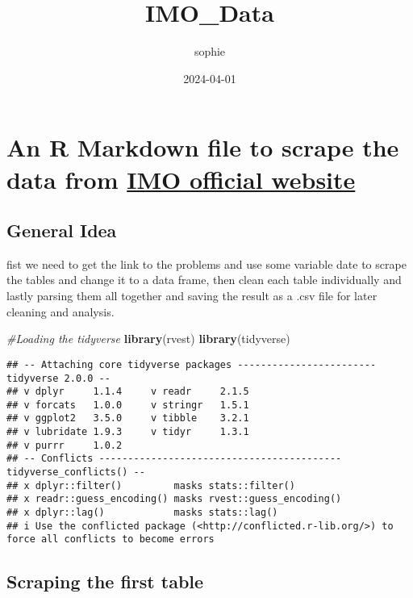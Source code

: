 \documentclass[
]{article}
\title{IMO\_Data}
\author{sophie}
\date{2024-04-01}
\newenvironment{Shaded}{\begin{snugshade}}{\end{snugshade}}
\newcommand{\CommentTok}[1]{\textcolor[rgb]{0.56,0.35,0.01}{\textit{#1}}}
\newcommand{\FunctionTok}[1]{\textcolor[rgb]{0.13,0.29,0.53}{\textbf{#1}}}
\newcommand{\NormalTok}[1]{#1}
\begin{document}
\maketitle

\hypertarget{an-r-markdown-file-to-scrape-the-data-from-imo-official-website}{%
\section{\texorpdfstring{An R Markdown file to scrape the data from
\href{https://www.imo-official.org/}{IMO official
website}}{An R Markdown file to scrape the data from IMO official website}}\label{an-r-markdown-file-to-scrape-the-data-from-imo-official-website}}

\hypertarget{general-idea}{%
\subsection{General Idea}\label{general-idea}}

fist we need to get the link to the problems and use some variable date
to scrape the tables and change it to a data frame, then clean each
table individually and lastly parsing them all together and saving the
result as a .csv file for later cleaning and analysis.

\begin{Shaded}
\begin{Highlighting}[]
\CommentTok{\#Loading the tidyverse}
\FunctionTok{library}\NormalTok{(rvest)}
\FunctionTok{library}\NormalTok{(tidyverse)}
\end{Highlighting}
\end{Shaded}

\begin{verbatim}
## -- Attaching core tidyverse packages ------------------------ tidyverse 2.0.0 --
## v dplyr     1.1.4     v readr     2.1.5
## v forcats   1.0.0     v stringr   1.5.1
## v ggplot2   3.5.0     v tibble    3.2.1
## v lubridate 1.9.3     v tidyr     1.3.1
## v purrr     1.0.2     
## -- Conflicts ------------------------------------------ tidyverse_conflicts() --
## x dplyr::filter()         masks stats::filter()
## x readr::guess_encoding() masks rvest::guess_encoding()
## x dplyr::lag()            masks stats::lag()
## i Use the conflicted package (<http://conflicted.r-lib.org/>) to force all conflicts to become errors
\end{verbatim}

\hypertarget{scraping-the-first-table}{%
\subsection{Scraping the first table}\label{scraping-the-first-table}}
\end{document}
